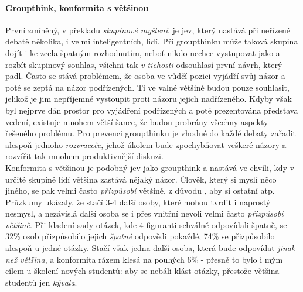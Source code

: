 \paragraph{Groupthink, konformita s většinou}
První zmíněný, v překladu \emph{skupinové myšlení}, je jev, který nastává při neřízené debatě několika, i velmi inteligentních, lidí. Při groupthinku může taková skupina dojít i ke zcela špatným rozhodnutím, neboť nikdo nechce vystupovat jako  a rozbít skupinový souhlas, všichni tak \emph{v tichosti} odsouhlasí první návrh, který padl. Často se stává problémem, že osoba ve vůdčí pozici vyjádří svůj názor a poté se zeptá na názor podřízených. Ti ve valné většině budou pouze souhlasit, jelikož je jim nepříjemné vystoupit proti názoru jejich nadřízeného. Kdyby však byl nejprve dán prostor pro vyjádření podřízených a poté prezentována představa vedení, existuje mnohem větší šance, že budou probrány všechny aspekty řešeného problému. Pro prevenci groupthinku je vhodné do každé debaty zařadit alespoň jednoho \emph{rozvraceče}, jehož úkolem bude zpochybňovat veškeré názory a rozvířit tak mnohem produktivnější diskuzi.\\
Konformita s většinou je podobný jev jako groupthink a nastává ve chvíli, kdy v určité skupině lidí většina zastává nějaký názor. Člověk, který si myslí něco jiného, se pak velmi často \emph{přizpůsobí} většině, z důvodu , aby si ostatní  atp. Průzkumy \cite{prochazka} ukázaly, že stačí 3-4 další osoby, které mohou tvrdit i naprostý nesmysl, a nezávislá další osoba se i přes vnitřní nevoli velmi často \emph{přizpůsobí většině}. Při kladení sady otázek, kde 4 figuranti schválně odpovídali špatně, se 32\% osob přizpůsobilo jejich \emph{špatné} odpovědi pokaždé, 74\% se přizpůsobilo alespoň u jedné otázky. Stačí však jedna další osoba, která bude odpovídat \emph{jinak než většina}, a konformita rázem klesá na pouhých 6\% - přesně to bylo i mým cílem u školení nových studentů: aby se nebáli klást otázky, přestože většina studentů jen \emph{kývala}.

